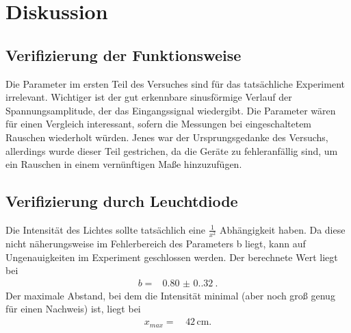 \section{Diskussion}
\label{sec:Diskussion}

\subsection{Verifizierung der Funktionsweise}
Die Parameter im ersten Teil des Versuches sind für das tatsächliche
Experiment irrelevant. Wichtiger ist der gut erkennbare sinusförmige Verlauf
der Spannungsamplitude, der das Eingangssignal wiedergibt. Die Parameter wären
für einen Vergleich interessant, sofern die Messungen bei eingeschaltetem
Rauschen wiederholt würden. Jenes war der Ursprungsgedanke des Versuchs, 
allerdings wurde dieser Teil gestrichen, da die Geräte zu fehleranfällig sind, 
um ein Rauschen in einem vernünftigen Maße hinzuzufügen.

\subsection{Verifizierung durch Leuchtdiode}
Die Intensität des Lichtes sollte tatsächlich eine $\frac{1}{x^2}$ 
Abhängigkeit haben. Da diese nicht näherungsweise im Fehlerbereich des
Parameters b liegt, kann auf Ungenauigkeiten im Experiment geschlossen 
werden. Der berechnete Wert liegt bei
\begin{align*}
    b =& \qty{0.80(0.32)}{}.     
\end{align*}
\noindent Der maximale Abstand, bei dem die Intensität minimal (aber noch 
groß genug für einen Nachweis) ist, liegt bei 
\begin{align*}
    x_{max} =& \, 42 \, \unit{\centi\meter}.
\end{align*}